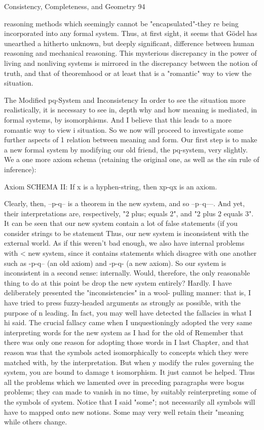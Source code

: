 Consistency, Completeness, and Geometry                                                    94

reasoning methods which seemingly cannot be "encapsulated"-they re being incorporated
into any formal system. Thus, at first sight, it seems that Gödel has unearthed a hitherto
unknown, but deeply significant, difference between human reasoning and mechanical
reasoning. This mysterious discrepancy in the power of living and nonliving systems is
mirrored in the discrepancy between the notion of truth, and that of theoremhood or at
least that is a "romantic" way to view the situation.

                  The Modified pq-System and Inconsistency
        In order to see the situation more realistically, it is necessary to see in, depth why
and how meaning is mediated, in formal systems, by isomorphisms. And I believe that
this leads to a more romantic way to view i situation. So we now will proceed to
investigate some further aspects of 1 relation between meaning and form. Our first step is
to make a new formal system by modifying our old friend, the pq-system, very slightly.
We a one more axiom schema (retaining the original one, as well as the sin rule of
inference):

       Axiom SCHEMA II: If x is a hyphen-string, then xp-qx is an axiom.

Clearly, then, --p-q-- is a theorem in the new system, and so --p--q---. And yet, their
interpretations are, respectively, "2 plus; equals 2", and "2 plus 2 equals 3". It can be seen
that our new system contain a lot of false statements (if you consider strings to be
statement Thus, our new system is inconsistent with the external world.
        As if this weren't bad enough, we also have internal problems with < new system,
since it contains statements which disagree with one another such as -p-q-- (an old
axiom) and -p-q- (a new axiom). So our system is inconsistent in a second sense:
internally.
        Would, therefore, the only reasonable thing to do at this point be drop the new
system entirely? Hardly. I have deliberately presented the "inconsistencies" in a wool-
pulling manner: that is, I have tried to press fuzzy-headed arguments as strongly as
possible, with the purpose of n leading. In fact, you may well have detected the fallacies
in what I hi said. The crucial fallacy came when I unquestioningly adopted the very same
interpreting words for the new system as I had for the old of Remember that there was
only one reason for adopting those words in I last Chapter, and that reason was that the
symbols acted isomorphically to concepts which they were matched with, by the
interpretation. But when y modify the rules governing the system, you are bound to
damage t isomorphism. It just cannot be helped. Thus all the problems which we
lamented over in preceding paragraphs were bogus problems; they can made to vanish in
no time, by suitably reinterpreting some of the symbols of system. Notice that I said
"some"; not necessarily all symbols will have to mapped onto new notions. Some may
very well retain their "meaning while others change.




